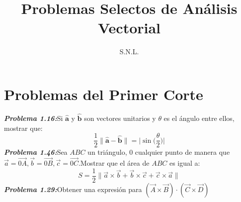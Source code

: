 \documentclass[a4paper]{article}
\title{Problemas Selectos de Análisis Vectorial}
\author{S.N.L.}
\date{}
\newcommand{\abs}[1]{\lVert #1 \rVert}
\newcommand{\problema}[1]{\textbf{\textit{Problema #1:}}}
\begin{document}
\maketitle
\section*{Problemas del Primer Corte}
\problema{1.16}Si $\mathbf{\hat{a}}$ y $\mathbf{\hat{b}}$ son vectores unitarios y $\theta$ es el ángulo entre ellos, mostrar que:
\[\frac{1}{2}\abs{\mathbf{\hat{a}}-\mathbf{\hat{b}}}=\Big\lvert \sin\Big(\frac{\theta}{2}\Big)\Big\rvert\]
\problema{1.46}Sea $ABC$ un triángulo, $0$ cualquier punto de manera que $\vec{a}=\overrightarrow{0A},\vec{b}=\overrightarrow{0B},\vec{c}=\overrightarrow{0C}$.Mostrar que el área de $ABC$ es igual a:
\[S=\frac{1}{2}\abs{\vec{a}\times\vec{b}+\vec{b}\times\vec{c}+\vec{c}\times\vec{a}}\]
\problema{1.29}Obtener una expresión para $(\vec{A}\times\vec{B})\cdot(\vec{C}\times\vec{D})$
\end{document}
